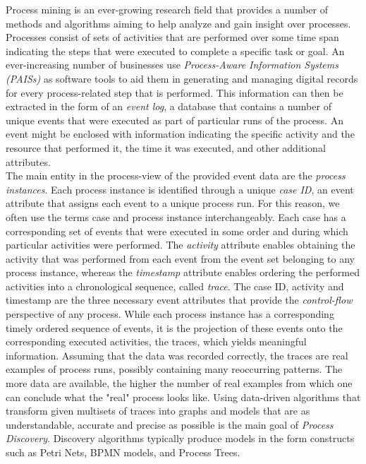 Process mining \cite{pm} is an ever-growing research field that provides a number of methods and algorithms aiming to help analyze and gain insight over processes.
Processes consist of sets of activities that are performed over some time span indicating the steps that were executed to complete a specific task or goal.
An ever-increasing number of businesses use \textit{Process-Aware Information Systems (PAISs)} as software tools to aid them in generating and managing digital records for every process-related step that is performed.
This information can then be extracted in the form of an \textit{event log}, a database that contains a number of unique events that were executed as part of particular runs of the process.
An event might be enclosed with information indicating the specific activity and the resource that performed it, the time it was executed, and other additional attributes.\\
The main entity in the process-view of the provided event data are the \textit{process instances}.
Each process instance is identified through a unique \textit{case ID}, an event attribute that assigns each event to a unique process run.
For this reason, we often use the terms case and process instance interchangeably.
Each case has a corresponding set of events that were executed in some order and during which particular activities were performed.
The \textit{activity} attribute enables obtaining the activity that was performed from each event from the event set belonging to any process instance, whereas the \textit{timestamp} attribute enables ordering the performed activities into a chronological sequence, called \textit{trace}.
The case ID, activity and timestamp are the three necessary event attributes that provide the \textit{control-flow} perspective of any process.
While each process instance has a corresponding timely ordered sequence of events, it is the projection of these events onto the corresponding executed activities, the traces, which yields meaningful information.
Assuming that the data was recorded correctly, the traces are real examples of process runs, possibly containing many reoccurring patterns.
The more data are available, the higher the number of real examples from which one can conclude what the "real" process looks like.
Using data-driven algorithms that transform given multisets of traces into graphs and models that are as understandable, accurate and precise as possible is the main goal of \textit{Process Discovery}.
Discovery algorithms typically produce models in the form constructs such as Petri Nets, BPMN models, and Process Trees.
